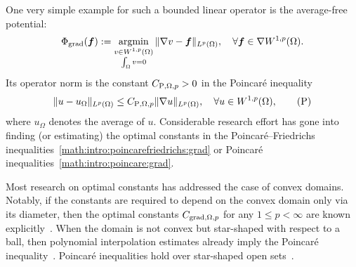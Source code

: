 \documentclass[10pt,letterpaper]{article}
\begin{document}
One very simple example for such a bounded linear operator is the average-free potential: %
\begin{align*}
    \Phi_{\operatorname{grad}}( \bm{f} ) 
    := 
    \operatorname*{{\rm argmin}}\limits_{ \substack{ v \in W^{1,p}(\Omega) \\ \int_\Omega v = 0 } } \| \nabla v - \bm{f} \|_{L^{p}(\Omega)},
    \quad 
    \forall 
    \bm{f} \in \nabla W^{1,p}(\Omega)
    .
\end{align*} 
Its operator norm is the constant $C_{{\rm P},\Omega,p} > 0$ in the Poincar\'e inequality 
\begin{align}\label{math:intro:poincare:grad}
    \| u - u_{\Omega} \|_{L^{p}(\Omega)}
    \leq 
    C_{{\rm P},\Omega,p} \| \nabla u \|_{L^{p}(\Omega)},
    \quad 
    \forall 
    u \in W^{1,p}(\Omega)
    , \tag{P} %
\end{align}
where $u_\Omega$ denotes the average of $u$.
Considerable research effort has gone into finding (or estimating) the optimal constants in the Poincar\'e--Friedrichs inequalities~\eqref{math:intro:poincarefriedrichs:grad} or Poincar\'e inequalities~\eqref{math:intro:poincare:grad}. 

Most research on optimal constants has addressed the case of convex domains. 
Notably, if the constants are required to depend on the convex domain only via its diameter, 
then the optimal constants $C_{\operatorname{grad},\Omega,p}$ for any $1 \leq p < \infty$ are known explicitly~\cite{bebendorf2003note,acosta2004optimal,esposito2013poincare,ferone2012remark}.
When the domain is not convex but star-shaped with respect to a ball,
then polynomial interpolation estimates already imply the Poincar\'e inequality~\cite{brenner2008mathematical,ern2021finite}. 
Poincar\'e inequalities hold over star-shaped open sets~\cite[Theorem~3.1]{hurri1988poincare}. %
\end{document}
